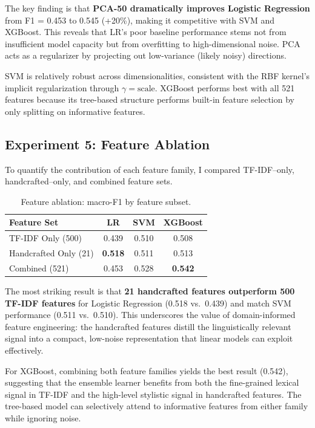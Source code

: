 \documentclass[12pt]{article}
\begin{document}
The key finding is that \textbf{PCA-50 dramatically improves Logistic
Regression} from F1 = 0.453 to 0.545 (+20\%), making it competitive with
SVM and XGBoost. This reveals that LR's poor baseline performance stems
not from insufficient model capacity but from overfitting to
high-dimensional noise. PCA acts as a regularizer by projecting out
low-variance (likely noisy) directions.

SVM is relatively robust across dimensionalities, consistent with the
RBF kernel's implicit regularization through $\gamma = \text{scale}$.
XGBoost performs best with all 521 features because its tree-based
structure performs built-in feature selection by only splitting on
informative features.

\subsection{Experiment 5: Feature Ablation}

To quantify the contribution of each feature family, I compared
TF-IDF--only, handcrafted--only, and combined feature sets.

\begin{table}[htbp]
\centering
\caption{Feature ablation: macro-F1 by feature subset.}
\label{tab:ablation}
\small
\begin{tabular}{lccc}
\toprule
\textbf{Feature Set} & \textbf{LR} & \textbf{SVM} & \textbf{XGBoost} \\
\midrule
TF-IDF Only (500)        & 0.439          & 0.510          & 0.508          \\
Handcrafted Only (21)     & \textbf{0.518} & 0.511          & 0.513          \\
Combined (521)            & 0.453          & 0.528          & \textbf{0.542} \\
\bottomrule
\end{tabular}
\end{table}

The most striking result is that \textbf{21 handcrafted features
outperform 500 TF-IDF features} for Logistic Regression (0.518 vs.\ 0.439)
and match SVM performance (0.511 vs.\ 0.510). This underscores the value
of domain-informed feature engineering: the handcrafted features distill
the linguistically relevant signal into a compact, low-noise
representation that linear models can exploit effectively.

For XGBoost, combining both feature families yields the best result
(0.542), suggesting that the ensemble learner benefits from both the
fine-grained lexical signal in TF-IDF and the high-level stylistic
signal in handcrafted features. The tree-based model can selectively
attend to informative features from either family while ignoring noise.
\end{document}
